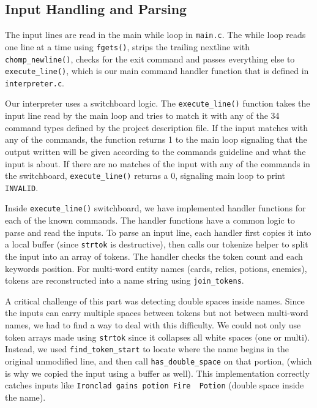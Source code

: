 \documentclass[12pt,a4paper]{article}
\begin{document}
\subsection{Input Handling and Parsing}

The input lines are read in the main while loop in \texttt{main.c}. The while loop reads one line at a time using \texttt{fgets()}, strips the trailing nextline with \texttt{chomp\_newline()}, checks for the exit command and passes everything else to \texttt{execute\_line()}, which is our main command handler function that is defined in \texttt{interpreter.c}.

Our interpreter uses a switchboard logic. The \texttt{execute\_line()} function takes the input line read by the main loop and tries to match it with any of the 34 command types defined by the project description file. If the input matches with any of the commands, the function returns 1 to the main loop signaling that the output written will be given according to the commands guideline and what the input is about. If there are no matches of the input with any of the commands in the switchboard, \texttt{execute\_line()} returns a 0, signaling main loop to print \texttt{INVALID}.

Inside \texttt{execute\_line()} switchboard, we have implemented handler functions for each of the known commands. The handler functions have a common logic to parse and read the inputs. To parse an input line, each handler first copies it into a local buffer (since \texttt{strtok} is destructive), then calls our tokenize helper to split the input into an array of tokens. The handler checks the token count and each keywords position. For multi-word entity names (cards, relics, potions, enemies), tokens are reconstructed into a name string using \texttt{join\_tokens}.

A critical challenge of this part was detecting double spaces inside names. Since the inputs can carry multiple spaces between tokens but not between multi-word names, we had to find a way to deal with this difficulty. We could not only use token arrays made using \texttt{strtok} since it collapses all white spaces (one or multi). Instead, we used \texttt{find\_token\_start} to locate where the name begins in the original unmodified line, and then call \texttt{has\_double\_space} on that portion, (which is why we copied the input using a buffer as well). This implementation correctly catches inputs like \texttt{Ironclad gains potion Fire\ \ Potion} (double space inside the name).
\end{document}
